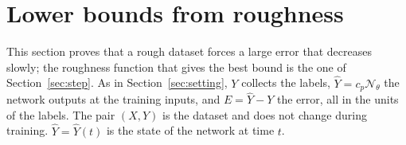 \documentclass[11pt]{article}
\theoremstyle{definition}
\theoremstyle{remark}
\newcommand{\Net}{\mathcal{N}_\theta}    %
\begin{document}
\section{Lower bounds from roughness}\label{sec:lower}

This section proves that a rough dataset forces a large error that decreases slowly; the roughness function that gives the best bound is the one of Section~\ref{sec:step}.
As in Section~\ref{sec:setting}, $Y$ collects the labels, $\hat Y = c_p\Net$ the network outputs at the training inputs, and $E = \hat Y - Y$ the error, all in the units of the labels.
The pair $(X, Y)$ is the dataset and does not change during training.
$\hat Y = \hat Y(t)$ is the state of the network at time $t$.
\end{document}
